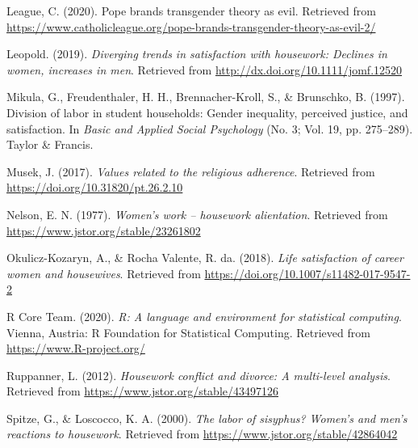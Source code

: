 \documentclass[
  man,floatsintext]{apa6}
\newlength{\cslhangindent}
\newlength{\cslentryspacingunit} %
\newenvironment{CSLReferences}[2] %
 {%
  \setlength{\parindent}{0pt}
  \ifodd #1
  \let\oldpar\par
  \def\par{\hangindent=\cslhangindent\oldpar}
  \fi
  \setlength{\parskip}{#2\cslentryspacingunit}
 }%
 {}
\begin{document}
\begin{CSLReferences}{1}{0}
\leavevmode{}%
League, C. (2020). Pope brands transgender theory as evil. Retrieved from \url{https://www.catholicleague.org/pope-brands-transgender-theory-as-evil-2/}

\leavevmode{}%
Leopold. (2019). \emph{Diverging trends in satisfaction with housework: Declines in women, increases in men}. Retrieved from \url{http://dx.doi.org/10.1111/jomf.12520}

\leavevmode{}%
Mikula, G., Freudenthaler, H. H., Brennacher-Kroll, S., \& Brunschko, B. (1997). Division of labor in student households: Gender inequality, perceived justice, and satisfaction. In \emph{Basic and Applied Social Psychology} (No. 3; Vol. 19, pp. 275--289). Taylor \& Francis.

\leavevmode{}%
Musek, J. (2017). \emph{Values related to the religious adherence}. Retrieved from \url{https://doi.org/10.31820/pt.26.2.10}

\leavevmode{}%
Nelson, E. N. (1977). \emph{Women's work -- housework alientation}. Retrieved from \url{https://www.jstor.org/stable/23261802}

\leavevmode{}%
Okulicz-Kozaryn, A., \& Rocha Valente, R. da. (2018). \emph{Life satisfaction of career women and housewives}. Retrieved from \url{https://doi.org/10.1007/s11482-017-9547-2}

\leavevmode{}%
R Core Team. (2020). \emph{R: A language and environment for statistical computing}. Vienna, Austria: R Foundation for Statistical Computing. Retrieved from \url{https://www.R-project.org/}

\leavevmode{}%
Ruppanner, L. (2012). \emph{Housework conflict and divorce: A multi-level analysis}. Retrieved from \url{https://www.jstor.org/stable/43497126}

\leavevmode{}%
Spitze, G., \& Loscocco, K. A. (2000). \emph{The labor of sisyphus? Women's and men's reactions to housework}. Retrieved from \url{https://www.jstor.org/stable/42864042}

\end{CSLReferences}


\clearpage
\renewcommand{\listfigurename}{Figure captions}

\clearpage
\renewcommand{\listtablename}{Table captions}
\end{document}
